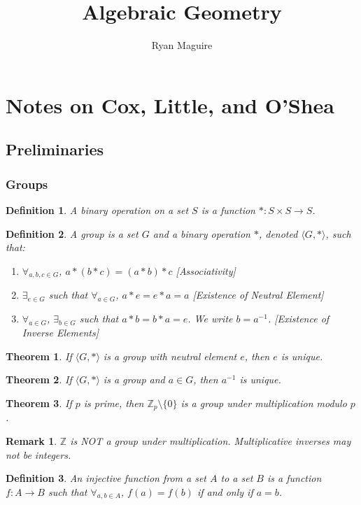 \documentclass{article}
\title{Algebraic Geometry}
\author{Ryan Maguire}
\date{\vspace{-5ex}}
\theoremstyle{mystyle}
\newtheorem{theorem}{Theorem}[section]
\newtheorem{definition}{Definition}[section]
\newtheorem{remark}{Remark}[section]
\begin{document}
\maketitle
\tableofcontents

\section{Notes on Cox, Little, and O'Shea}
\subsection{Preliminaries}
\subsubsection{Groups}
\begin{definition}
A binary operation on a set $S$ is a function $*:S\times S \rightarrow S$.
\end{definition}
\begin{definition}
A group is a set $G$ and a binary operation $*$, denoted $\langle G,*\rangle$, such that:
\begin{enumerate}
    \item $\forall_{a,b,c\in G}$, $a*(b*c) = (a*b)*c$ \hfill [Associativity]
    \item $\exists_{e\in G}$ such that $\forall_{a\in G}$, $a*e=e*a = a$ \hfill [Existence of Neutral Element]
    \item $\forall_{a\in G}$, $\exists_{b\in G}$ such that $a*b = b*a = e$. We write $b=a^{-1}$. \hfill [Existence of Inverse Elements]
\end{enumerate}
\end{definition}
\begin{theorem}
If $\langle G, *\rangle$ is a group with neutral element $e$, then $e$ is unique.
\end{theorem}
\begin{theorem}
If $\langle G,*\rangle$ is a group and $a\in G$, then $a^{-1}$ is unique.
\end{theorem}
\begin{theorem}
If $p$ is prime, then $\mathbb{Z}_p\setminus \{0\}$ is a group under multiplication modulo $p$.
\end{theorem}
\begin{remark}
$\mathbb{Z}$ is NOT a group under multiplication. Multiplicative inverses may not be integers.
\end{remark}
\begin{definition}
An injective function from a set $A$ to a set $B$ is a function $f:A\rightarrow B$ such that $\forall_{a,b\in A}$, $f(a) = f(b)$ if and only if $a=b$.
\end{definition}
\end{document}
